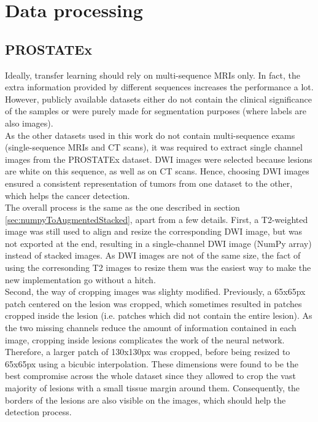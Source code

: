 \section{Data processing}
\subsection{PROSTATEx}
\label{sec:PROSTATEx}
\setlength{\marginparwidth}{3cm}\leavevmode {}Ideally, transfer learning should rely on multi-sequence MRIs only. In fact, the extra information provided by different sequences increases the performance a lot. However, publicly available datasets either do not contain the clinical significance of the samples or were purely made for segmentation purposes (where labels are also images).\\
As the other datasets used in this work do not contain multi-sequence exams (single-sequence MRIs and CT scans), it was required to extract single channel images from the PROSTATEx dataset. DWI images were selected because lesions are white on this sequence, as well as on CT scans. Hence, choosing DWI images ensured a consistent representation of tumors from one dataset to the other, which helps the cancer detection.\\
The overall process is the same as the one described in section \ref{sec:numpyToAugmentedStacked}, apart from a few details. First, a T2-weighted image was still used to align and resize the corresponding DWI image, but was not exported at the end, resulting in a single-channel DWI image (NumPy array) instead of stacked images. As DWI images are not of the same size, the fact of using the corresonding T2 images to resize them was the easiest way to make the new implementation go without a hitch.\\
Second, the way of cropping images was slighty modified. Previously, a 65x65px patch centered on the lesion was cropped, which sometimes resulted in patches cropped inside the lesion (i.e. patches which did not contain the entire lesion). As the two missing channels reduce the amount of information contained in each image, cropping inside lesions complicates the work of the neural network. Therefore, a larger patch of 130x130px was cropped, before being resized to 65x65px using a bicubic interpolation. These dimensions were found to be the best compromise across the whole dataset since they allowed to crop the vast majority of lesions with a small tissue margin around them. Consequently, the borders of the lesions are also visible on the images, which should help the detection process. 


